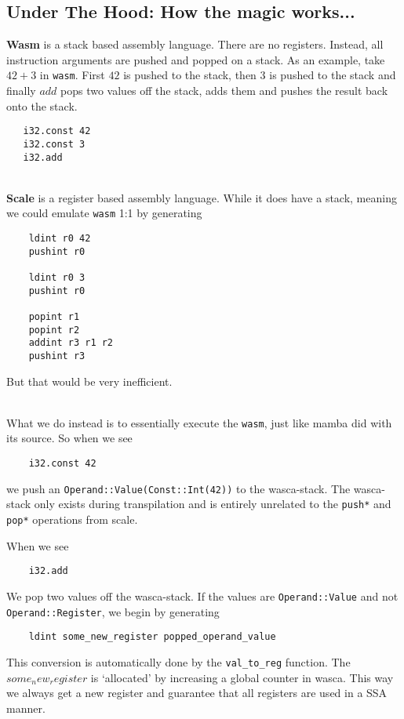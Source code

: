 \subsection{Under The Hood: How the magic works...}

\noindent
{\bf{Wasm}} is a stack based assembly language.
There are no registers. Instead, all instruction arguments are pushed and popped on a stack.
As an example, take $42 + 3$ in \verb|wasm|. First $42$ is pushed to the stack, then $3$ is pushed to the
stack and finally $add$ pops two values off the stack, adds them and pushes the result back onto the stack.

\begin{lstlisting}
   i32.const 42
   i32.const 3
   i32.add
\end{lstlisting}

~ \\

\noindent
{\bf{Scale}} is a register based assembly language.
While it does have a stack, meaning we could emulate \verb|wasm| 1:1 by generating

\begin{lstlisting}
    ldint r0 42
    pushint r0

    ldint r0 3
    pushint r0

    popint r1
    popint r2
    addint r3 r1 r2
    pushint r3
\end{lstlisting}
But that would be very inefficient.

~ \\

What we do instead is to essentially execute the \verb|wasm|, just like mamba did with its source. So when we see
\begin{lstlisting}
    i32.const 42
\end{lstlisting}
we push an \verb|Operand::Value(Const::Int(42))| to the wasca-stack.
The wasca-stack only exists during transpilation and is entirely unrelated to the \verb|push*| and \verb|pop*|
operations from scale.

When we see
\begin{lstlisting}
    i32.add
\end{lstlisting}
We pop two values off the wasca-stack. If the values are \verb|Operand::Value| and not
\verb|Operand::Register|, we begin by generating

\begin{lstlisting}
    ldint some_new_register popped_operand_value
\end{lstlisting}
This conversion is automatically done by the \verb|val_to_reg| function.
The $some_new_register$ is `allocated' by increasing a global counter in wasca.
This way we always get a new register and guarantee that all registers are used in a SSA manner.

